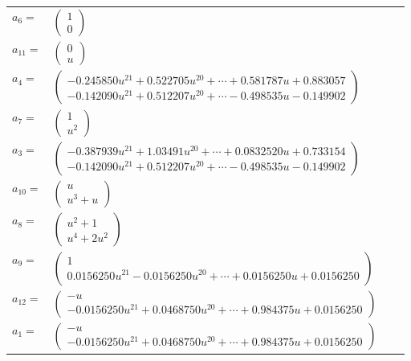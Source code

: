 \documentclass[1p]{elsarticle_modified}
\theoremstyle{definition}
\begin{document}
\begin{tabular}{m{7pt} m{180pt} m{7pt} m{180pt} }
\flushright $a_{6}=$&$\begin{pmatrix}1\\0\end{pmatrix}$ \\
\flushright $a_{11}=$&$\begin{pmatrix}0\\u\end{pmatrix}$ \\
\flushright $a_{4}=$&$\begin{pmatrix}-0.245850 u^{21}+0.522705 u^{20}+\cdots+0.581787 u+0.883057\\-0.142090 u^{21}+0.512207 u^{20}+\cdots-0.498535 u-0.149902\end{pmatrix}$ \\
\flushright $a_{7}=$&$\begin{pmatrix}1\\u^2\end{pmatrix}$ \\
\flushright $a_{3}=$&$\begin{pmatrix}-0.387939 u^{21}+1.03491 u^{20}+\cdots+0.0832520 u+0.733154\\-0.142090 u^{21}+0.512207 u^{20}+\cdots-0.498535 u-0.149902\end{pmatrix}$ \\
\flushright $a_{10}=$&$\begin{pmatrix}u\\u^3+u\end{pmatrix}$ \\
\flushright $a_{8}=$&$\begin{pmatrix}u^2+1\\u^4+2 u^2\end{pmatrix}$ \\
\flushright $a_{9}=$&$\begin{pmatrix}1\\0.0156250 u^{21}-0.0156250 u^{20}+\cdots+0.0156250 u+0.0156250\end{pmatrix}$ \\
\flushright $a_{12}=$&$\begin{pmatrix}- u\\-0.0156250 u^{21}+0.0468750 u^{20}+\cdots+0.984375 u+0.0156250\end{pmatrix}$ \\
\flushright $a_{1}=$&$\begin{pmatrix}- u\\-0.0156250 u^{21}+0.0468750 u^{20}+\cdots+0.984375 u+0.0156250\end{pmatrix}$ \\

\end{tabular}
\end{document}
